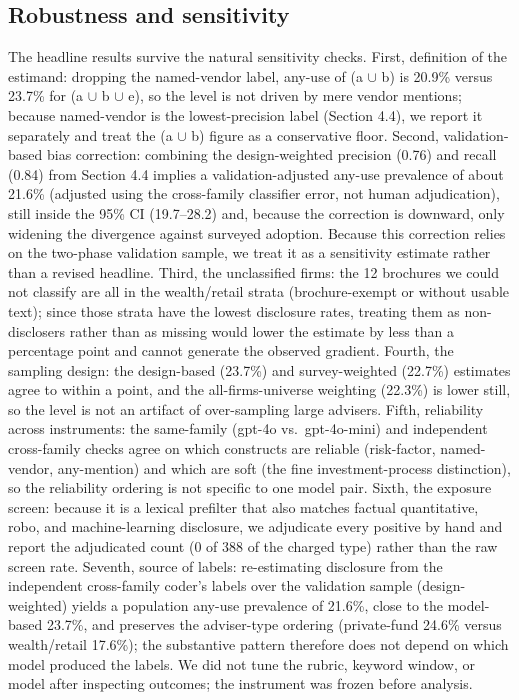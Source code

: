 \documentclass[utf8]{FrontiersinHarvard}
\begin{document}
\subsection{Robustness and sensitivity}
The headline results survive the natural sensitivity checks. First, definition of the estimand: dropping the named-vendor label, any-use of (a $\cup$ b) is 20.9\% versus 23.7\% for (a $\cup$ b $\cup$ e), so the level is not driven by mere vendor mentions; because named-vendor is the lowest-precision label (Section 4.4), we report it separately and treat the (a $\cup$ b) figure as a conservative floor. Second, validation-based bias correction: combining the design-weighted precision (0.76) and recall (0.84) from Section 4.4 implies a validation-adjusted any-use prevalence of about 21.6\% (adjusted using the cross-family classifier error, not human adjudication), still inside the 95\% CI (19.7--28.2) and, because the correction is downward, only widening the divergence against surveyed adoption. Because this correction relies on the two-phase validation sample, we treat it as a sensitivity estimate rather than a revised headline. Third, the unclassified firms: the 12 brochures we could not classify are all in the wealth/retail strata (brochure-exempt or without usable text); since those strata have the lowest disclosure rates, treating them as non-disclosers rather than as missing would lower the estimate by less than a percentage point and cannot generate the observed gradient. Fourth, the sampling design: the design-based (23.7\%) and survey-weighted (22.7\%) estimates agree to within a point, and the all-firms-universe weighting (22.3\%) is lower still, so the level is not an artifact of over-sampling large advisers. Fifth, reliability across instruments: the same-family (gpt-4o vs.\ gpt-4o-mini) and independent cross-family checks agree on which constructs are reliable (risk-factor, named-vendor, any-mention) and which are soft (the fine investment-process distinction), so the reliability ordering is not specific to one model pair. Sixth, the exposure screen: because it is a lexical prefilter that also matches factual quantitative, robo, and machine-learning disclosure, we adjudicate every positive by hand and report the adjudicated count (0 of 388 of the charged type) rather than the raw screen rate. Seventh, source of labels: re-estimating disclosure from the independent cross-family coder's labels over the validation sample (design-weighted) yields a population any-use prevalence of 21.6\%, close to the model-based 23.7\%, and preserves the adviser-type ordering (private-fund 24.6\% versus wealth/retail 17.6\%); the substantive pattern therefore does not depend on which model produced the labels. We did not tune the rubric, keyword window, or model after inspecting outcomes; the instrument was frozen before analysis.
\end{document}
